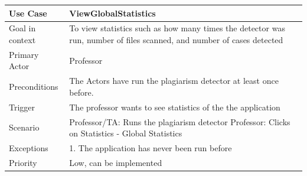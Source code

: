 \documentclass[12pt]{article}
\begin{document}
\begin{tabular}{ |p{3cm}||p{11.25cm}| }
 \hline
 \textbf{Use Case} & \textbf{ViewGlobalStatistics}\\
 \hline
 Goal in context & To view statistics such as how many times the detector was run, number of files scanned, and number of cases detected\\
 \hline
 Primary Actor & Professor \\
 \hline
 Preconditions& The Actors have run the plagiarism detector at least once before.\\
 \hline
 Trigger &The professor wants to see statistics of the the application\\
 \hline
 Scenario    &Professor/TA: Runs the plagiarism detector\newline
 Professor: Clicks on Statistics - Global Statistics\\
\hline
 Exceptions&  
1. The application has never been run before
\\
\hline
 Priority& Low, can be implemented \\
 \hline
\end{tabular} \\[2.0 em]
\end{document}

